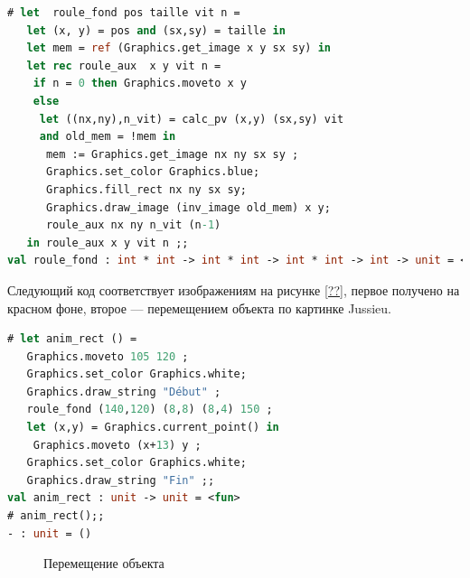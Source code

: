 \begin{lstlisting}[language=OCaml]
# let  roule_fond pos taille vit n =
   let (x, y) = pos and (sx,sy) = taille in
   let mem = ref (Graphics.get_image x y sx sy) in 
   let rec roule_aux  x y vit n =
    if n = 0 then Graphics.moveto x y
    else 
     let ((nx,ny),n_vit) = calc_pv (x,y) (sx,sy) vit 
     and old_mem = !mem in 
      mem := Graphics.get_image nx ny sx sy ;
      Graphics.set_color Graphics.blue;
      Graphics.fill_rect nx ny sx sy;
      Graphics.draw_image (inv_image old_mem) x y;
      roule_aux nx ny n_vit (n-1)
   in roule_aux x y vit n ;;
val roule_fond : int * int -> int * int -> int * int -> int -> unit = <fun>
\end{lstlisting}

Следующий код соответствует изображениям на рисунке \ref{??}, первое получено 
на красном фоне, второе --- перемещением объекта по картинке Jussieu.

\begin{lstlisting}[language=OCaml]
# let anim_rect () = 
   Graphics.moveto 105 120 ;
   Graphics.set_color Graphics.white;
   Graphics.draw_string "Début" ;
   roule_fond (140,120) (8,8) (8,4) 150 ;
   let (x,y) = Graphics.current_point() in 
    Graphics.moveto (x+13) y ;
   Graphics.set_color Graphics.white;
   Graphics.draw_string "Fin" ;;
val anim_rect : unit -> unit = <fun>
# anim_rect();;
- : unit = ()
\end{lstlisting}

\begin{figure}[h]
	\caption{\label{fig:moving_an_object}Перемещение объекта}
\end{figure}

